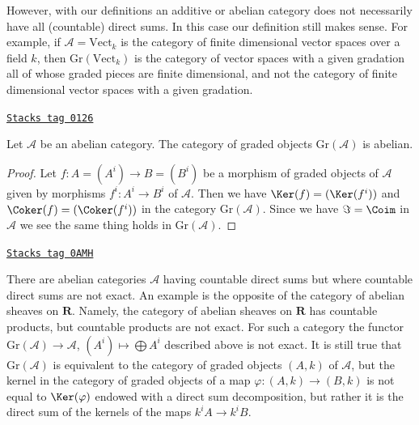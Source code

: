 \medskip\noindent
However, with our definitions an additive or abelian category does not
necessarily have all (countable) direct sums. In this case our definition
still makes sense. For example, if $\mathcal{A} = \text{Vect}_k$ is the
category of finite dimensional vector spaces over a field $k$, then
$\text{Gr}(\text{Vect}_k)$ is the category of vector
spaces with a given gradation all of whose graded pieces are finite
dimensional, and not the category of finite dimensional vector
spaces with a given gradation.

\begin{lemma}[Graded]
\label{homology-lemma-graded}
\href{https://stacks.math.columbia.edu/tag/0126}{\texttt{Stacks tag 0126}}

Let $\mathcal{A}$ be an abelian category. The category of graded objects
$\text{Gr}(\mathcal{A})$ is abelian.
\end{lemma}

\begin{proof}
Let $f : A = (A^i) \to B = (B^i)$ be a morphism of graded objects
of $\mathcal{A}$ given by
morphisms $f^i : A^i \to B^i$ of $\mathcal{A}$.
Then we have $\Ker(f) = (\Ker(f^i))$ and $\Coker(f) = (\Coker(f^i))$
in the category $\text{Gr}(\mathcal{A})$.
Since we have $\Im = \Coim$ in $\mathcal{A}$
we see the same thing holds in $\text{Gr}(\mathcal{A})$.
\end{proof}

\begin{remark}[Warning]

\label{homology-remark-direct-sums-not-exact}
\href{https://stacks.math.columbia.edu/tag/0AMH}{\texttt{Stacks tag 0AMH}}

There are abelian categories $\mathcal{A}$ having countable direct sums
but where countable direct sums are not exact. An example
is the opposite of the category of abelian sheaves on $\mathbf{R}$.
Namely, the category of abelian sheaves on $\mathbf{R}$ has
countable products, but countable products are not exact.
For such a category the functor $\text{Gr}(\mathcal{A}) \to \mathcal{A}$,
$(A^i) \mapsto \bigoplus A^i$
described above is not exact. It is still true that
$\text{Gr}(\mathcal{A})$ is equivalent to the category of
graded objects $(A, k)$ of $\mathcal{A}$, but the kernel in the category
of graded objects of a map $\varphi : (A, k) \to (B, k)$ is not equal to
$\Ker(\varphi)$ endowed with a direct sum decomposition, but rather it is
the direct sum of the kernels of the maps $k^iA \to k^iB$.
\end{remark}

